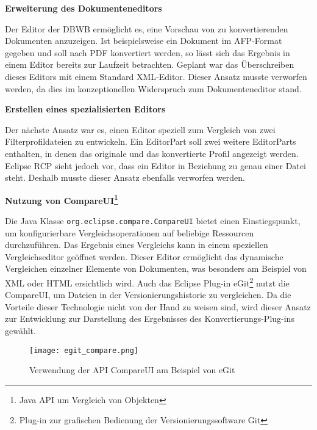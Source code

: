 {{{\textbf{Erweiterung des Dokumenteneditors}{

Der Editor der \ac{DBWB} ermöglicht es, eine Vorschau von zu konvertierenden Dokumenten anzuzeigen. Ist beispielsweise ein Dokument im \ac{AFP}-Format gegeben und soll nach \ac{PDF} konvertiert werden, so lässt sich das Ergebnis in einem Editor bereits zur Laufzeit betrachten. Geplant war das Überschreiben dieses Editors mit einem Standard XML-Editor. Dieser Ansatz musste verworfen werden, da dies im konzeptionellen Widerspruch zum Dokumenteneditor stand.

}

\textbf{Erstellen eines spezialisierten Editors}{

Der nächste Ansatz war es, einen Editor speziell zum Vergleich von zwei Filterprofildateien zu entwickeln. Ein EditorPart soll zwei weitere EditorParts enthalten, in denen das originale und das konvertierte Profil angezeigt werden. Eclipse \ac{RCP} sieht jedoch vor, dass ein Editor in Beziehung zu genau einer Datei steht. Deshalb musste dieser Ansatz ebenfalls verworfen werden. 

}

\textbf{Nutzung von CompareUI\footnote{Java \ac{API}
 um Vergleich von Objekten}}{
 
 Die Java Klasse \texttt{org.eclipse.compare.CompareUI} bietet einen Einstiegspunkt, um konfigurierbare Vergleichsoperationen auf beliebige Ressourcen durchzuführen. Das Ergebnis eines Vergleichs kann in einem speziellen Vergleichseditor geöffnet werden. Dieser Editor ermöglicht das dynamische Vergleichen einzelner Elemente von Dokumenten, was besonders am Beispiel von \ac{XML} oder \ac{HTML} ersichtlich wird. Auch das Eclipse Plug-in eGit\footnote{Plug-in zur grafischen Bedienung der Versionierungssoftware Git} nutzt die CompareUI, um Dateien in der Versionierungshistorie zu vergleichen. Da die Vorteile dieser Technologie nicht von der Hand zu weisen sind, wird dieser Ansatz zur Entwicklung zur Darstellung des Ergebnisses des Konvertierungs-Plug-ins gewählt.

\begin{figure}[htbp] 
  \centering
     \texttt{[image: egit\_compare.png]}
  \caption{Verwendung der API CompareUI am Beispiel von eGit}
  \label{fig:egit_compare}
\end{figure}

}



}

}






}
